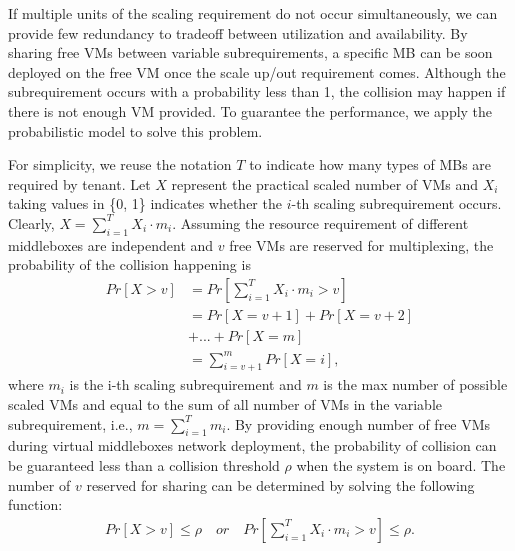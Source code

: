 \documentclass[review]{elsarticle}
\begin{document}
If multiple units of the scaling requirement do not occur simultaneously, we can provide few redundancy to tradeoff between utilization and availability. By sharing free VMs between variable subrequirements, a specific MB can be soon deployed on the free VM once the scale up/out requirement comes. Although the subrequirement occurs with a probability less than 1, the collision may happen if there is not enough VM provided. To guarantee the performance, we apply the probabilistic model to solve this problem. 

For simplicity, we reuse the notation $T$ to indicate how many types of MBs are required by tenant. Let $X$ represent the practical scaled  number of VMs and $X_{i}$ taking values in \{0, 1\} indicates whether the $i$-th scaling subrequirement occurs. Clearly, $X=\sum_{i=1}^{T}X_{i}\cdot m_{i}$. Assuming the resource requirement of different middleboxes are independent and $v$ free VMs are reserved for multiplexing, the probability of the collision happening is
\begin{equation} 
\begin{aligned}
Pr\left[X>v\right]
& = Pr\left[\sum_{i=1}^{T}X_{i}\cdot m_{i}>v\right]\\
& = Pr\left[X=v+1 \right] + Pr\left[X=v+2 \right]\\
& + ...+ Pr\left[X=m \right] \\
& = \sum_{i=v+1}^{m}Pr\left[X=i \right],
\end{aligned}
\end{equation}
where $m_i$ is the i-th scaling subrequirement and $m$ is the max number of possible scaled VMs and equal to the sum of all number of VMs in the variable subrequirement, i.e., $m=\sum_{i=1}^{T} m_i$. 
By providing enough number of free VMs during virtual middleboxes network deployment, the probability of collision can be guaranteed less than a collision threshold $\rho$ when the system is on board. The number of $v$ reserved for sharing can be determined by solving the following function:
\begin{equation}\label{equ:collision}  
\begin{aligned} 
Pr\left[ X>v \right] \leq \rho \quad or	\quad Pr\left[ \sum_{i=1}^{T} X_{i}\cdot m_{i} > v \right] \leq \rho.
\end{aligned}
\end{equation}
\end{document}

